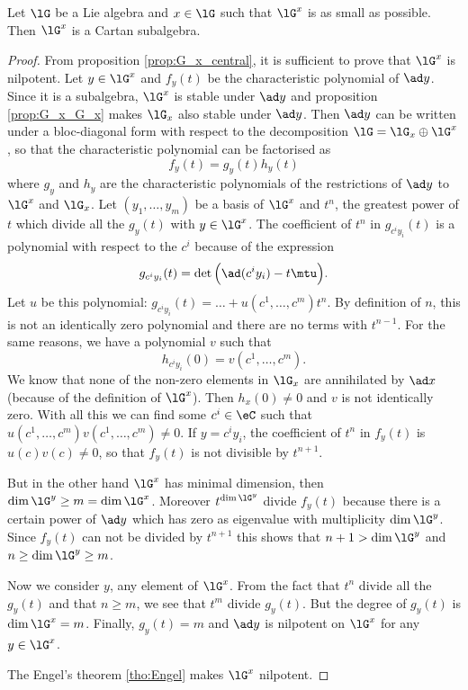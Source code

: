 \begin{proposition}
Let $\lG$ be a Lie algebra and $x\in\lG$ such that $\lG^x$ is as small as possible. Then $\lG^x$ is a Cartan subalgebra.
\end{proposition}

\begin{proof}
From proposition \ref{prop:G_x_central}, it is sufficient to prove that $\lG^x$ is nilpotent. Let $y\in\lG^x$ and $f_y(t)$ be the characteristic polynomial of $\ad y$. Since it is a subalgebra, $\lG^x$ is stable under $\ad y$ and proposition \ref{prop:G_x_G_x} makes $\lG_x$ also stable under $\ad y$. Then $\ad y$ can be written under a bloc-diagonal form with respect to the decomposition $\lG=\lG_x\oplus\lG^x$, so that the characteristic polynomial can be factorised as
\begin{equation} 
f_y(t)=g_y(t)h_y(t)
\end{equation}
where $g_y$ and $h_y$ are the characteristic polynomials of the restrictions of $\ad y$ to $\lG^x$ and $\lG_x$. Let $(y_1,\ldots,y_m)$ be a basis of $\lG^x$ and $t^n$, the greatest power of $t$ which divide all the $g_y(t)$ with $y\in\lG^x$. The coefficient of $t^n$ in $g_{c^iy_i}(t)$ is a polynomial with respect to the $c^i$ because of the expression 
\[
g_{c^iy_i}(t)=\det\Big( \ad(c^iy_i)-t\mtu \Big).
\]
Let $u$ be this polynomial: $g_{c^iy_i}(t)=\ldots+u(c^1,\ldots,c^m)t^n$. By definition of $n$, this is not an identically zero polynomial and there are no terms with $t^{n-1}$. For the same reasons, we have a polynomial $v$ such that
\begin{equation}
h_{c^iy_i}(0)=v(c^1,\ldots,c^m).
\end{equation}
We know that none of the non-zero elements in $\lG_x$ are annihilated by $\ad x$ (because of the definition of $\lG^x$). Then $h_x(0)\neq 0$ and $v$ is not identically zero. With all this we can find some $c^i\in\eC$ such that $u(c^1,\ldots,c^m)v(c^1,\ldots,c^m)\neq 0$. If $y=c^iy_i$, the coefficient of $t^n$ in $f_y(t)$ is $u(c)v(c)\neq 0$, so that $f_y(t)$ is not divisible by $t^{n+1}$.

But in the other hand $\lG^x$ has minimal dimension, then $\dim\lG^y\geq m=\dim\lG^x$. Moreover $t^{\dim\lG^y}$ divide $f_y(t)$ because there is a certain power of $\ad y$ which has zero as eigenvalue with multiplicity $\dim\lG^y$. Since $f_y(t)$ can not be divided by $t^{n+1}$ this shows that $n+1>\dim\lG^y$ and $n\geq\dim\lG^y\geq m$.

Now we consider $y$, any element of $\lG^x$. From the fact that $t^n$ divide all the $g_y(t)$ and that $n\geq m$, we see that $t^m$ divide $g_y(t)$. But the degree of $g_y(t)$ is $\dim\lG^x=m$. Finally, $g_y(t)=m$ and $\ad y$ is nilpotent on $\lG^x$ for any $y\in\lG^x$.

The Engel's theorem  \ref{tho:Engel} makes $\lG^x$ nilpotent.
\end{proof}


